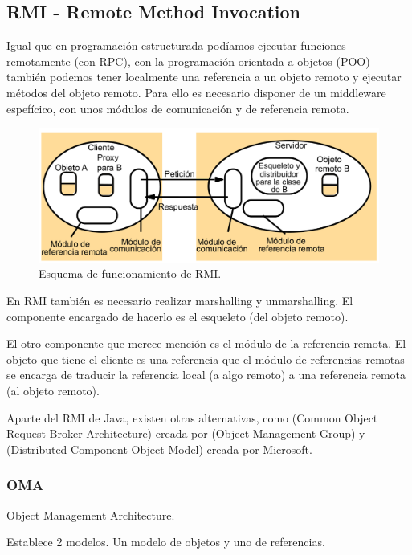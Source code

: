 \documentclass{apuntes}[nochap]
\begin{document}
\subsection{RMI - Remote Method Invocation}

Igual que en programación estructurada podíamos ejecutar funciones remotamente (con RPC), con la programación orientada a objetos (POO) también podemos tener localmente una referencia a un objeto remoto y ejecutar métodos del objeto remoto. Para ello es necesario disponer de un middleware espefícico, con unos módulos de comunicación y de referencia remota.


\begin{figure}[hbtp]
\centering
\includegraphics[width=1\textwidth]{img/RMI.png}
\caption{Esquema de funcionamiento de RMI.}
\label{RMI}
\end{figure}

En RMI también es necesario realizar marshalling y unmarshalling. El componente encargado de hacerlo es el esqueleto (del objeto remoto).

El otro componente que merece mención es el módulo de la referencia remota. El objeto que tiene el cliente es una referencia que el módulo de referencias remotas se encarga de traducir la referencia local (a algo remoto) a una referencia remota (al objeto remoto).

Aparte del RMI de Java, existen otras alternativas, como  (Common Object Request Broker Architecture) creada por  (Object Management Group) y  (Distributed Component Object Model) creada por Microsoft.

\subsubsection{OMA}
\begin{defn}[OMA]
Object Management Architecture.

Establece 2 modelos. Un modelo de objetos y uno de referencias.
\end{defn}
\end{document}
